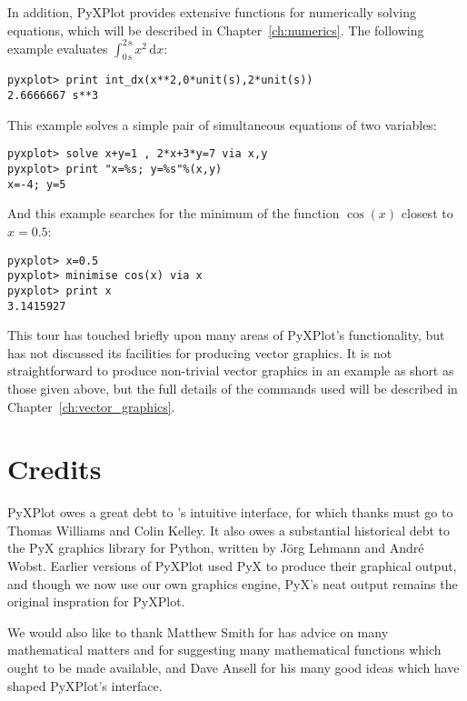 In addition, PyXPlot provides extensive functions for numerically solving
equations, which will be described in Chapter~\ref{ch:numerics}. The following
example evaluates $\int_{0\,\mathrm{s}}^{2\,\mathrm{s}} x^2\,\mathrm{d}x$:

\begin{verbatim}
pyxplot> print int_dx(x**2,0*unit(s),2*unit(s))
2.6666667 s**3
\end{verbatim}

This example solves a simple pair of simultaneous equations of two variables:

\begin{verbatim}
pyxplot> solve x+y=1 , 2*x+3*y=7 via x,y
pyxplot> print "x=%s; y=%s"%(x,y)
x=-4; y=5
\end{verbatim}

And this example searches for the minimum of the function $\cos(x)$ closest to $x=0.5$:

\begin{verbatim}
pyxplot> x=0.5
pyxplot> minimise cos(x) via x
pyxplot> print x
3.1415927
\end{verbatim}

This tour has touched briefly upon many areas of PyXPlot's functionality, but
has not discussed its facilities for producing vector graphics. It is not
straightforward to produce non-trivial vector graphics in an example as short
as those given above, but the full details of the commands used will be
described in Chapter~\ref{ch:vector_graphics}.

\section{Credits}

PyXPlot owes a great debt to \gnuplot's intuitive interface, for which thanks
must go to Thomas Williams and Colin Kelley.  It also owes a substantial
historical debt to the PyX graphics library for Python, written by
J\"org Lehmann and Andr\'e Wobst.
Earlier versions of PyXPlot used PyX to produce their graphical output, and
though we now use our own graphics engine, PyX's neat output remains the
original inspration for PyXPlot.

We would also like to thank Matthew Smith for has advice on many mathematical
matters and for suggesting many mathematical functions which ought to be made
available, and Dave Ansell for his many good ideas which have shaped PyXPlot's
interface.

